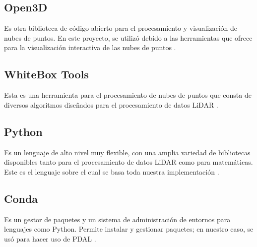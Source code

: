 \subsection{Open3D}
Es otra biblioteca de código abierto para el procesamiento y visualización de nubes de puntos. En este proyecto, se utilizó debido a las herramientas que ofrece para la visualización interactiva de las nubes de puntos \cite{Open3d}.

\subsection{WhiteBox Tools}
Esta es una herramienta para el procesamiento de nubes de puntos que consta de diversos algoritmos diseñados para el procesamiento de datos LiDAR \cite{Whitebox}.

\subsection{Python}
Es un lenguaje de alto nivel muy flexible, con una amplia variedad de bibliotecas disponibles tanto para el procesamiento de datos LiDAR como para matemáticas. Este es el lenguaje sobre el cual se basa toda nuestra implementación \cite{python}.

\subsection{Conda}
Es un gestor de paquetes y un sistema de administración de entornos para lenguajes como Python. Permite instalar y gestionar paquetes; en nuestro caso, se usó para hacer uso de PDAL \cite{conda}.


